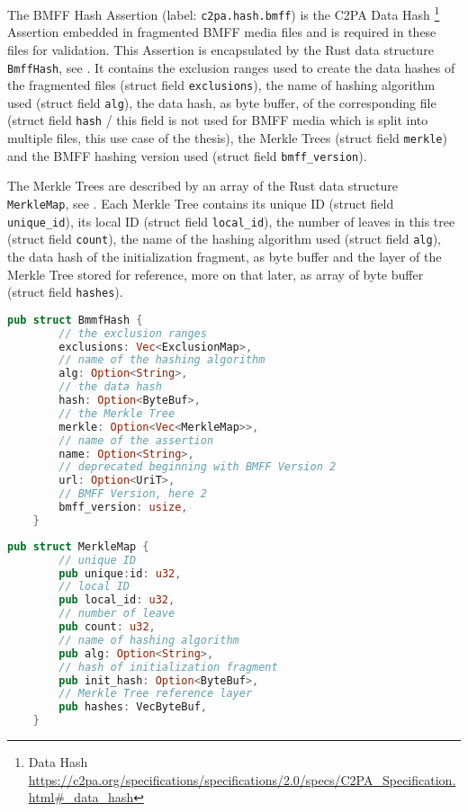 The BMFF Hash Assertion (label: \texttt{c2pa.hash.bmff}) is the C2PA Data Hash \footnote{Data Hash \url{https://c2pa.org/specifications/specifications/2.0/specs/C2PA_Specification.html\#_data_hash}} Assertion embedded in fragmented BMFF media files and is required in these files for validation. This Assertion is encapsulated by the Rust data structure \texttt{BmffHash}, see . It contains the exclusion ranges used to create the data hashes of the fragmented files (struct field \texttt{exclusions}), the name of hashing algorithm used (struct field \texttt{alg}), the data hash, as byte buffer, of the corresponding file (struct field \texttt{hash} / this field is not used for BMFF media which is split into multiple files, this use case of the thesis), the Merkle Trees (struct field \texttt{merkle}) and the BMFF hashing version used (struct field \texttt{bmff\_version}).

The Merkle Trees are described by an array of the Rust data structure \texttt{MerkleMap}, see . Each Merkle Tree contains its unique ID (struct field \texttt{unique\_id}), its local ID (struct field \texttt{local\_id}), the number of leaves in this tree (struct field \texttt{count}), the name of the hashing algorithm used (struct field \texttt{alg}), the data hash of the initialization fragment, as byte buffer and the layer of the Merkle Tree stored for reference, more on that later, as array of byte buffer (struct field \texttt{hashes}).

\begin{minipage}{\linewidth}
\begin{lstlisting}[caption={BmffHash Rust Definition}, label=code:bmff_hash, language=Rust, captionpos=b]
    pub struct BmmfHash {
        // the exclusion ranges
        exclusions: Vec<ExclusionMap>,
        // name of the hashing algorithm
        alg: Option<String>,
        // the data hash
        hash: Option<ByteBuf>,
        // the Merkle Tree
        merkle: Option<Vec<MerkleMap>>,
        // name of the assertion
        name: Option<String>,
        // deprecated beginning with BMFF Version 2
        url: Option<UriT>,
        // BMFF Version, here 2
        bmff_version: usize,
    }
\end{lstlisting}
\end{minipage}

\begin{minipage}{\linewidth}
\begin{lstlisting}[caption={MerkleMap Rust Definition}, label=code:merkle_map, language=Rust, captionpos=b]
    pub struct MerkleMap {
        // unique ID
        pub unique:id: u32,
        // local ID
        pub local_id: u32,
        // number of leave
        pub count: u32,
        // name of hashing algorithm
        pub alg: Option<String>,
        // hash of initialization fragment
        pub init_hash: Option<ByteBuf>,
        // Merkle Tree reference layer
        pub hashes: VecByteBuf,
    }
\end{lstlisting}
\end{minipage}


